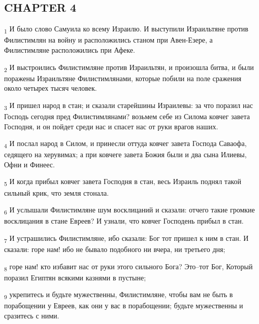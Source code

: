 \subsection{CHAPTER 4}
\begin{tcolorbox}
\textsubscript{1} И было слово Самуила ко всему Израилю. И выступили Израильтяне против Филистимлян на войну и расположились станом при Авен-Езере, а Филистимляне расположились при Афеке.
\end{tcolorbox}
\begin{tcolorbox}
\textsubscript{2} И выстроились Филистимляне против Израильтян, и произошла битва, и были поражены Израильтяне Филистимлянами, которые побили на поле сражения около четырех тысяч человек.
\end{tcolorbox}
\begin{tcolorbox}
\textsubscript{3} И пришел народ в стан; и сказали старейшины Израилевы: за что поразил нас Господь сегодня пред Филистимлянами? возьмем себе из Силома ковчег завета Господня, и он пойдет среди нас и спасет нас от руки врагов наших.
\end{tcolorbox}
\begin{tcolorbox}
\textsubscript{4} И послал народ в Силом, и принесли оттуда ковчег завета Господа Саваофа, седящего на херувимах; а при ковчеге завета Божия были и два сына Илиевы, Офни и Финеес.
\end{tcolorbox}
\begin{tcolorbox}
\textsubscript{5} И когда прибыл ковчег завета Господня в стан, весь Израиль поднял такой сильный крик, что земля стонала.
\end{tcolorbox}
\begin{tcolorbox}
\textsubscript{6} И услышали Филистимляне шум восклицаний и сказали: отчего такие громкие восклицания в стане Евреев? И узнали, что ковчег Господень прибыл в стан.
\end{tcolorbox}
\begin{tcolorbox}
\textsubscript{7} И устрашились Филистимляне, ибо сказали: Бог тот пришел к ним в стан. И сказали: горе нам! ибо не бывало подобного ни вчера, ни третьего дня;
\end{tcolorbox}
\begin{tcolorbox}
\textsubscript{8} горе нам! кто избавит нас от руки этого сильного Бога? Это--тот Бог, Который поразил Египтян всякими казнями в пустыне;
\end{tcolorbox}
\begin{tcolorbox}
\textsubscript{9} укрепитесь и будьте мужественны, Филистимляне, чтобы вам не быть в порабощении у Евреев, как они у вас в порабощении; будьте мужественны и сразитесь с ними.
\end{tcolorbox}

